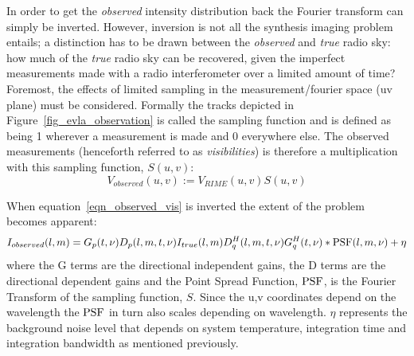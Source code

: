 In order to get the \emph{observed} intensity distribution back the Fourier transform can simply be inverted. However, inversion is not all the synthesis imaging problem entails; a distinction has to be drawn
between the \emph{observed} and \emph{true} radio sky: how much of the \emph{true} radio sky can be recovered, given the imperfect measurements made with a radio interferometer over a limited amount of time? Foremost, the
effects of limited sampling in the measurement/fourier space (uv plane) must be considered. Formally the tracks depicted in Figure~\ref{fig_evla_observation} is called the sampling function and is defined as being 1 wherever 
a measurement is made and 0 everywhere else. The observed measurements (henceforth referred to as \emph{visibilities}) is therefore a multiplication with this sampling function, $S(u,v)$:
\begin{equation}
 V_{observed}(u,v) := V_{RIME}(u,v)S(u,v)
 \label{eqn_observed_vis}
\end{equation}

When equation~\ref{eqn_observed_vis} is inverted the extent of the problem becomes apparent:
\begin{equation}
 I_{observed}(l,m) = G_p(t,\nu)D_p(l,m,t,\nu)I_{true}(l,m)D_q^H(l,m,t,\nu)G_q^H(t,\nu)*\textrm{PSF}{(l,m,\nu)} + \eta
\end{equation}
where the G terms are the directional independent gains, the D terms are the directional dependent gains and the Point Spread Function, $\textrm{PSF}$, is the Fourier Transform of the sampling function, $S$. Since
the u,v coordinates depend on the wavelength the $\textrm{PSF}$ in turn also scales depending on wavelength. $\eta$ represents the background noise level that depends on system temperature, integration time and integration
bandwidth as mentioned previously.

